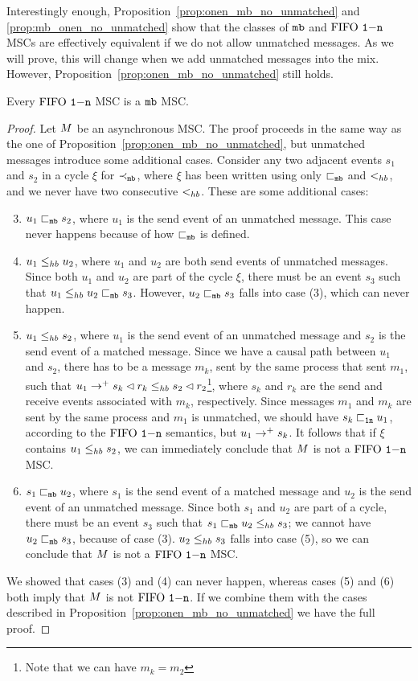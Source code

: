 Interestingly enough, Proposition~\ref{prop:onen_mb_no_unmatched} and \ref{prop:mb_onen_no_unmatched} show that the classes of $\mathtt{mb}$ and $\text{FIFO } \mathtt{1\mathsf{-}n}$ MSCs are effectively equivalent if we do not allow unmatched messages. As we will prove, this will change when we add unmatched messages into the mix. However, Proposition~\ref{prop:onen_mb_no_unmatched} still holds.

\begin{proposition} \label{prop:onen_mb_unmatched}
	Every $\text{FIFO } \mathtt{1\mathsf{-}n}$ MSC is a $\mathtt{mb}$ MSC.
\end{proposition}
\begin{proof}
Let $M$ be an asynchronous MSC. The proof proceeds in the same way as the one of Proposition~\ref{prop:onen_mb_no_unmatched}, but unmatched messages introduce some additional cases. Consider any two adjacent events $s_1$ and $s_2$ in a cycle $\xi$ for $\prec_{\mathtt{mb}}$, where $\xi$ has been written using only $\sqsubset_{\mathtt{mb}}$ and $<_{hb}$, and we never have two consecutive $<_{hb}$. These are some additional cases:
\begin{enumerate}\setcounter{enumi}{2}
	\item $u_1 \sqsubset_{\mathtt{mb}} s_2$, where $u_1$ is the send event of an unmatched message. This case never happens because of how $\sqsubset_{\mathtt{mb}}$ is defined.
	\item $u_1 \leq_{hb} u_2$, where $u_1$ and $u_2$ are both send events of unmatched messages. Since both $u_1$ and $u_2$ are part of the cycle $\xi$, there must be an event $s_3$ such that $u_1 \leq_{hb} u_2 \sqsubset_{\mathtt{mb}} s_3$. However, $u_2 \sqsubset_{\mathtt{mb}} s_3$ falls into case (3), which can never happen.
	\item $u_1 \leq_{hb} s_2$, where $u_1$ is the send event of an unmatched message and $s_2$ is the send event of a matched message. Since we have a causal path between $u_1$ and $s_2$, there has to be a message $m_k$, sent by the same process that sent $m_1$, such that $u_1 \to^+ s_k \lhd r_k \leq_{hb} s_2 \lhd r_2$\footnote{Note that we can have $m_k = m_2$}, where $s_k$ and $r_k$ are the send and receive events associated with $m_k$, respectively. Since messages $m_1$ and $m_k$ are sent by the same process and $m_1$ is unmatched, we should have $s_k \sqsubset_{\mathtt{1n}} u_1$, according to the $\text{FIFO } \mathtt{1\mathsf{-}n}$ semantics, but $u_1 \to^+ s_k$. It follows that if $\xi$ contains $u_1 \leq_{hb} s_2$, we can immediately conclude that $M$ is not a $\text{FIFO } \mathtt{1\mathsf{-}n}$ MSC.
	\item $s_1 \sqsubset_{\mathtt{mb}} u_2$,  where $s_1$ is the send event of a matched message and $u_2$ is the send event of an unmatched message. Since both $s_1$ and $u_2$ are part of a cycle, there must be an event $s_3$ such that $s_1 \sqsubset_{\mathtt{mb}} u_2 \leq_{hb} s_3$; we cannot have $u_2 \sqsubset_{\mathtt{mb}} s_3$, because of case (3). $u_2 \leq_{hb} s_3$ falls into case (5), so we can conclude that $M$ is not a $\text{FIFO } \mathtt{1\mathsf{-}n}$ MSC.
\end{enumerate}
We showed that cases (3) and (4) can never happen, whereas cases (5) and (6) both imply that $M$ is not $\text{FIFO } \mathtt{1\mathsf{-}n}$. If we combine them with the cases described in Proposition~\ref{prop:onen_mb_no_unmatched} we have the full proof.
\end{proof}

